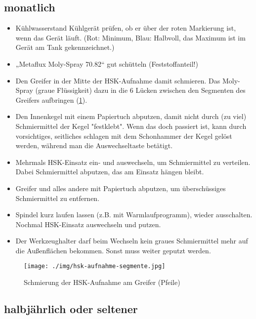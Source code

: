 \documentclass{\basedir/fablab-document}
\begin{document}
\subsection{monatlich}

\begin{itemize}
	\item Kühlwasserstand Kühlgerät prüfen, ob er über der roten Markierung ist, wenn das Gerät läuft. (Rot: Minimum, Blau: Halbvoll, das Maximum ist im Gerät am Tank gekennzeichnet.)
	\item „Metaflux Moly-Spray 70.82“ gut schütteln (Feststoffanteil!)
	\item Den Greifer in der Mitte der HSK-Aufnahme damit schmieren. Das Moly-Spray (graue Flüssigkeit) dazu in die 6 Lücken zwischen den Segmenten des Greifers aufbringen (\cref{fig:hsk-greifer}). 
	\item Den Innenkegel mit einem Papiertuch abputzen, damit nicht durch (zu viel) Schmiermittel der Kegel "festklebt". Wenn das doch passiert ist, kann durch vorsichtiges, seitliches schlagen mit dem Schonhammer der Kegel gelöst werden, während man die Auswechseltaste betätigt.
	\item Mehrmals HSK-Einsatz ein- und auswechseln, um Schmiermittel zu verteilen. Dabei Schmiermittel abputzen, das am Einsatz hängen bleibt.
	\item Greifer und alles andere mit Papiertuch abputzen, um überschüssiges Schmiermittel zu entfernen.
	\item Spindel kurz laufen lassen (z.B. mit Warmlaufprogramm), wieder ausschalten. Nochmal HSK-Einsatz auswechseln und putzen.
	\item Der Werkzeughalter darf beim Wechseln kein graues Schmiermittel mehr auf die Außenflächen bekommen. Sonst muss weiter geputzt werden.
\end{itemize}

\begin{figure}[ht]
\centering
\texttt{[image: ./img/hsk-aufnahme-segmente.jpg]}
\caption{Schmierung der HSK-Aufnahme am Greifer (Pfeile)}
\label{fig:hsk-greifer}
\end{figure}

\subsection{halbjährlich oder seltener}
\end{document}
